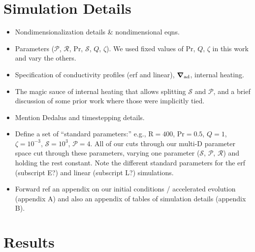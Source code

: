 \documentclass[12pt, fullpage]{article}
\renewcommand{\vec}[1]{\boldsymbol{#1}}
\newcommand{\grad}{\vec{\nabla}}
\begin{document}
\section{Simulation Details}
\begin{itemize}
\item Nondimensionalization details \& nondimensional eqns.
\item Parameters ($\mathcal{P}$, $\mathcal{R}$, Pr, $\mathcal{S}$, $Q$, $\zeta$).
We used fixed values of Pr, $Q$, $\zeta$ in this work and vary the others.
\item Specification of conductivity profiles (erf and linear), $\grad_{\rm{ad}}$, internal heating.
\item The magic sauce of internal heating that allows splitting $\mathcal{S}$ and $\mathcal{P}$, and a brief discussion of some prior work where those were implicitly tied.
\item Mention Dedalus \citep{burns_etal_2020} and timestepping details.
\item Define a set of ``standard parameters:'' e.g., $\mathrm{R} = 400$, $\mathrm{Pr} = 0.5$, $Q = 1$, $\zeta = 10^{-3}$, $\mathcal{S} = 10^3$, $\mathcal{P} = 4$.
All of our cuts through our multi-D parameter space cut through these parameters, varying one parameter ($\mathcal{S}$, $\mathcal{P}$, $\mathcal{R}$) and holding the rest constant.
Note the different standard parameters for the erf (subscript E?) and linear (subscript L?) simulations.
\item Forward ref an appendix on our initial conditions / accelerated evolution (appendix A) and also an appendix of tables of simulation details (appendix B).
\end{itemize}

\section{Results}
\end{document}
